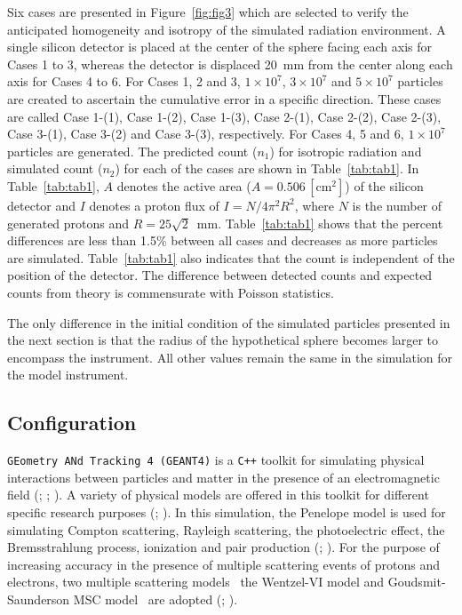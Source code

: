 \documentclass{jkas}
\begin{document}
Six cases are presented in Figure~\ref{fig:fig3} which are selected to verify the anticipated homogeneity and isotropy of the simulated radiation environment. A single silicon detector is placed at the center of the sphere facing each axis for Cases 1 to 3, whereas the detector is displaced 20~mm from the center along each axis for Cases 4 to 6. For Cases 1, 2 and 3, $1\times10^7$, $3\times10^7$ and $5\times10^7$ particles are created to ascertain the cumulative error in a specific direction. These cases are called Case 1-(1), Case 1-(2), Case 1-(3), Case 2-(1), Case 2-(2), Case 2-(3), Case 3-(1), Case 3-(2) and Case 3-(3), respectively. For Cases 4, 5 and 6, $1\times10^7$ particles are generated. The predicted count ($n_1$) for isotropic radiation and simulated count ($n_2$) for each of the cases are shown in Table~\ref{tab:tab1}. In Table~\ref{tab:tab1}, $A$ denotes the active area ($A = 0.506\, [\mathrm{cm}^2]$) of the silicon detector and $I$ denotes a proton flux of $I = N/4\pi^2R^2$, where $N$ is the number of generated protons and $R = 25\sqrt2$~mm. Table~\ref{tab:tab1} shows that the percent differences are less than 1.5\% between all cases and decreases as more particles are simulated. Table~\ref{tab:tab1} also indicates that the count is independent of the position of the detector. The difference between detected counts and expected counts from theory is commensurate with Poisson statistics.

The only difference in the initial condition of the simulated particles presented in the next section is that the radius of the hypothetical sphere becomes larger to encompass the instrument. All other values remain the same in the simulation for the model instrument.

\subsection{Configuration\label{sec:confi}}

{\tt GEometry ANd Tracking 4 (GEANT4)} is a {\tt C++} toolkit for simulating physical interactions between particles and matter in the presence of an electromagnetic field (\citealt{agostinelli2003}; \citealt{ivanchenko2004}; \citealt{allison2007}). A variety of physical models are offered in this toolkit for different specific research purposes (\citealt{chauvie2004}; \citealt{valentin2012}). In this simulation, the Penelope model is used for simulating Compton scattering, Rayleigh scattering, the photoelectric effect, the Bremsstrahlung process, ionization and pair production (\citealt{salvat2003}; \citealt{sempau2003}). For the purpose of increasing accuracy in the presence of multiple scattering events of protons and electrons, two multiple scattering models \textendash\, the Wentzel-VI model and Goudsmit-Saunderson MSC model \textendash\, are adopted (\citealt{ivanchenko2010}; \citealt{fioretti2017}).
\end{document}
